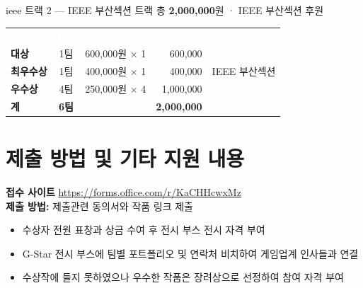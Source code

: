 \documentclass[11pt, a4paper]{article}
\begin{document}
\vspace{8pt}

\begin{trackheader}{ieee}
  트랙 2 \;—\; IEEE 부산섹션 트랙 \hfill
  {\normalfont\small 총 \textbf{2,000,000}원 \;·\; IEEE 부산섹션 후원}
\end{trackheader}
\vspace{-4pt}
\begin{infocard}[colframe=ieee!30]
\renewcommand{\arraystretch}{1.4}
\begin{tabularx}{\textwidth}{@{}l c r r l@{}}
  \rowcolor{tabhead}
  \textcolor{white}{\textsf{\bfseries 등급}} &
  \textcolor{white}{\textsf{\bfseries 팀수}} &
  \textcolor{white}{\textsf{\bfseries 상금}} &
  \textcolor{white}{\textsf{\bfseries 상금계}} &
  \textcolor{white}{\textsf{\bfseries 재원}} \\
  \textbf{대상}     & 1팀 & 600,000원 $\times$ 1 & 600,000
    & \multirow{3}{*}{\small IEEE 부산섹션} \\
  \rowcolor{tabrow}
  \textbf{최우수상} & 1팀 & 400,000원 $\times$ 1 & 400,000   & \\
  \textbf{우수상}   & 4팀 & 250,000원 $\times$ 4 & 1,000,000 & \\
  \arrayrulecolor{lightborder}\midrule
  \textbf{계} & \textbf{6팀} & & \textbf{2,000,000} & \\
\end{tabularx}
\end{infocard}


\section{제출 방법 및 기타 지원 내용}

\begin{highlightbox}
  \textbf{\color{accent}접수 사이트} \quad \url{https://forms.office.com/r/KaCHHcwxMz}\\[2pt]
  \textbf{제출 방법:} 제출관련 동의서와 작품 링크 제출
\end{highlightbox}

\vspace{4pt}

\begin{infocard}[title={\bfseries\color{primary} 기타 지원 내용}, coltitle=primary, colbacktitle=primary!6, attach boxed title to top left={yshift=-2mm, xshift=8mm}, boxed title style={boxrule=0.4pt, colframe=primary!30, arc=3pt}]
\begin{itemize}[leftmargin=1.5em, itemsep=5pt, label={\color{successgreen}\textbullet}]
  \item 수상자 전원 표창과 상금 수여 후 전시 부스 전시 자격 부여
  \item G-Star 전시 부스에 팀별 포트폴리오 및 연락처 비치하여 게임업계 인사들과 연결
  \item 수상작에 들지 못하였으나 우수한 작품은 장려상으로 선정하여 참여 자격 부여
\end{itemize}
\end{infocard}
\end{document}
